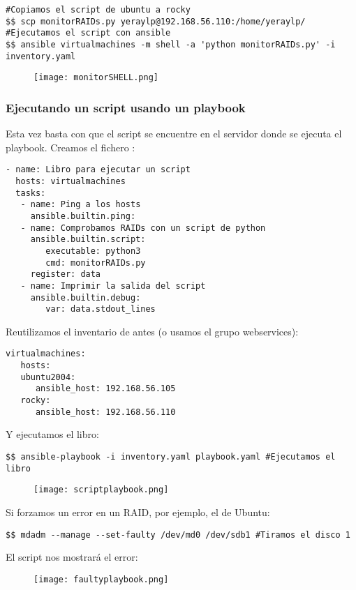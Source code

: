 \begin{verbatim}
#Copiamos el script de ubuntu a rocky
$$ scp monitorRAIDs.py yeraylp@192.168.56.110:/home/yeraylp/
#Ejecutamos el script con ansible
$$ ansible virtualmachines -m shell -a 'python monitorRAIDs.py' -i inventory.yaml
\end{verbatim}
\begin{figure}[H]
	\centering
	\texttt{[image: monitorSHELL.png]} 
\end{figure}

\subsubsection{Ejecutando un script usando un playbook}
Esta vez basta con que el script se encuentre en el servidor donde se ejecuta el playbook. Creamos el fichero :
\begin{verbatim}
- name: Libro para ejecutar un script
  hosts: virtualmachines
  tasks:
   - name: Ping a los hosts
     ansible.builtin.ping:
   - name: Comprobamos RAIDs con un script de python
     ansible.builtin.script:
        executable: python3
        cmd: monitorRAIDs.py
     register: data
   - name: Imprimir la salida del script
     ansible.builtin.debug:
        var: data.stdout_lines
\end{verbatim}
Reutilizamos el inventario de antes (o usamos el grupo webservices):
\begin{verbatim}
virtualmachines:
   hosts:
   ubuntu2004:
      ansible_host: 192.168.56.105
   rocky:
      ansible_host: 192.168.56.110
\end{verbatim}
Y ejecutamos el libro:
\begin{verbatim}
$$ ansible-playbook -i inventory.yaml playbook.yaml #Ejecutamos el libro
\end{verbatim}

\begin{figure}[H]
	\centering
	\texttt{[image: scriptplaybook.png]} 
\end{figure}

Si forzamos un error en un RAID, por ejemplo, el de Ubuntu:\\

\begin{verbatim}
$$ mdadm --manage --set-faulty /dev/md0 /dev/sdb1 #Tiramos el disco 1
\end{verbatim}
El script nos mostrará el error:
\begin{figure}[H]
	\centering
	\texttt{[image: faultyplaybook.png]} 
\end{figure}

